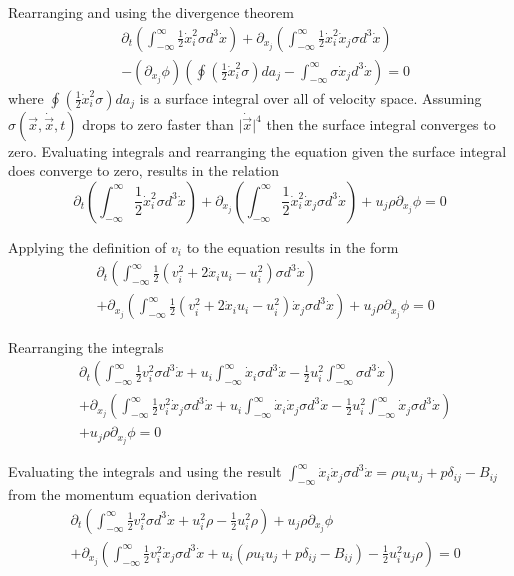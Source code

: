 \documentclass[%
 reprint,
 amsmath,amssymb,
 aps,
]{revtex4-1}
\newcommand{\dvec}[1]{\dot{\vec{#1}}}
\newcommand{\intVdot}[1]{\int_{-\infty}^{\infty} #1 d^3\dot{x}}
\begin{document}
Rearranging and using the divergence theorem
\[
\begin{split}
& \partial_t\left(\intVdot{\frac{1}{2}\dot{x}_i^2\sigma}\right) + \partial_{x_j}\left(\intVdot{\frac{1}{2}\dot{x}_i^2\dot{x}_j\sigma}\right) \\ & -  \left(\partial_{x_j}\phi\right)\left(\oint\left(\frac{1}{2}\dot{x}_i^2\sigma\right)da_j - \intVdot{\sigma\dot{x}_j}\right)=0
\end{split}
\]
where $\oint\left(\frac{1}{2}\dot{x}_i^2\sigma\right)da_j$ is a surface integral over all of velocity space. Assuming $\sigma(\vec{x}, \dvec{x}, t)$ drops to zero faster than $\lvert\dvec{x}\rvert^4$ then the surface integral converges to zero. Evaluating integrals and rearranging the equation given the surface integral does converge to zero, results in the relation
\[
\partial_t\left(\intVdot{\frac{1}{2}\dot{x}_i^2\sigma}\right) + \partial_{x_j}\left(\intVdot{\frac{1}{2}\dot{x}_i^2\dot{x}_j\sigma}\right) + u_j\rho\partial_{x_j}\phi=0
\]

Applying the definition of $v_i$ to the equation results in the form
\[
\begin{split}
& \partial_t\left(\intVdot{\frac{1}{2}\left(v_i^2 + 2\dot{x}_i u_i - u_i^2\right)\sigma}\right) \\ & + \partial_{x_j}\left(\intVdot{\frac{1}{2}\left(v_i^2 + 2\dot{x}_i u_i - u_i^2\right)\dot{x}_j\sigma}\right) + u_j\rho\partial_{x_j}\phi=0
\end{split}
\]

Rearranging the integrals
\[
\begin{split}
& \partial_t\left(\intVdot{\frac{1}{2}v_i^2\sigma} + u_i\intVdot{\dot{x}_i\sigma} - \frac{1}{2}u_i^2\intVdot{\sigma}\right) \\ & + \partial_{x_j}\left(\intVdot{\frac{1}{2}v_i^2\dot{x}_j\sigma} +  u_i\intVdot{\dot{x}_i\dot{x}_j\sigma} - \frac{1}{2}u_i^2\intVdot{\dot{x}_j\sigma}\right) \\ & + u_j\rho\partial_{x_j}\phi=0
\end{split}
\]

Evaluating the integrals and using the result $\intVdot{\dot{x}_i\dot{x}_j\sigma}=\rho u_i u_j + p\delta_{ij} - B_{ij}$ from the momentum equation derivation
\[
\begin{split}
& \partial_t\left(\intVdot{\frac{1}{2}v_i^2\sigma} + u_i^2\rho - \frac{1}{2}u_i^2\rho\right) + u_j\rho\partial_{x_j}\phi \\ & + \partial_{x_j}\left(\intVdot{\frac{1}{2}v_i^2\dot{x}_j\sigma} +  u_i\left(\rho u_i u_j + p\delta_{ij} - B_{ij}\right) - \frac{1}{2}u_i^2 u_j\rho\right) =0
\end{split}
\]
\end{document}
